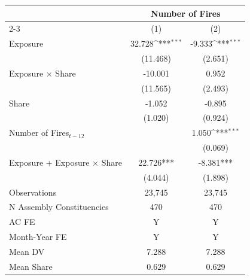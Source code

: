 {
\def\sym#1{\ifmmode^{#1}\else\(^{#1}\)\fi}
\begin{tabular}{l*{2}{c}}
\toprule
            &\multicolumn{2}{c}{Number of Fires}        \\\cmidrule(lr){2-3}
            &\multicolumn{1}{c}{(1)}         &\multicolumn{1}{c}{(2)}         \\
\midrule
Exposure    &      32.728\sym{***}&      -9.333\sym{***}\\
            &    (11.468)         &     (2.651)         \\
Exposure $\times$ Share&     -10.001         &       0.952         \\
            &    (11.565)         &     (2.493)         \\
Share       &      -1.052         &      -0.895         \\
            &     (1.020)         &     (0.924)         \\
Number of Fires$_{t-12}$&                     &       1.050\sym{***}\\
            &                     &     (0.069)         \\
\midrule
Exposure + Exposure $\times$ Share&   22.726***         &   -8.381***         \\
            &     (4.044)         &     (1.898)         \\
Observations&      23,745         &      23,745         \\
N Assembly Constituencies&         470         &         470         \\
AC FE       &           Y         &           Y         \\
Month-Year FE&           Y         &           Y         \\
Mean DV     &       7.288         &       7.288         \\
Mean Share  &       0.629         &       0.629         \\
\bottomrule
\end{tabular}
}

